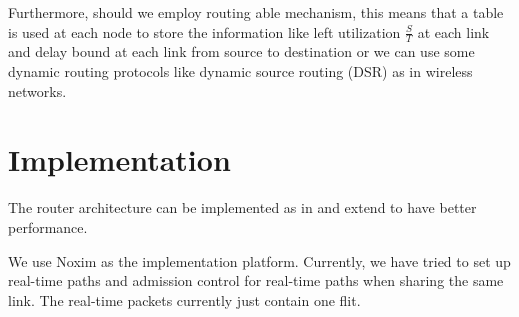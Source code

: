 \documentclass[10pt]{article}
\begin{document}
Furthermore, should we employ routing able mechanism, this means that a table 
is used at each node to store the information like left utilization $\frac{S}{T}$ at 
each link and delay bound at each link from source to destination or we can 
use some dynamic routing protocols like dynamic source routing (DSR) as in wireless networks.

\section{Implementation}
The router architecture can be implemented as in \cite{Rexford98arouter, Zhang_1service} 
and extend \cite{PehDelayModel, PehSpecPipeR} to have better performance.

We use Noxim \cite{Noxim} as the implementation platform. Currently, we have tried
to set up real-time paths and admission control for real-time paths when sharing 
the same link. The real-time packets currently just contain one flit.



\end{document}
